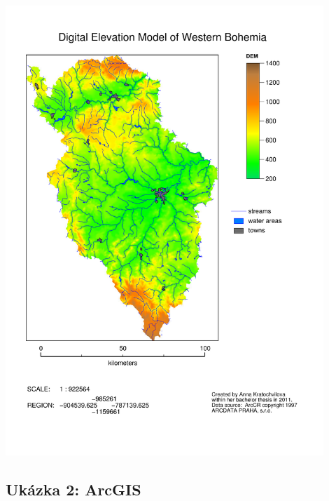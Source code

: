 \documentclass[a4paper,12pt,draft]{article}
\begin{document}
\begin{center}
 \includegraphics[width=0.9\textwidth]
 {./map_vystupy/psmap/DEM.pdf}
\end{center}

\newpage
\subsection{Ukázka 2: ArcGIS}
\label{priloha:vystupy:arcgis2}
\end{document}
